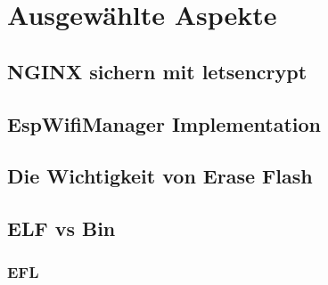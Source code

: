 \chapter{Ausgewählte Aspekte}

\section{NGINX sichern  mit letsencrypt}

\section{EspWifiManager Implementation}

\section{Die Wichtigkeit von Erase Flash}

\section{ELF vs Bin}

\subsection{EFL}
